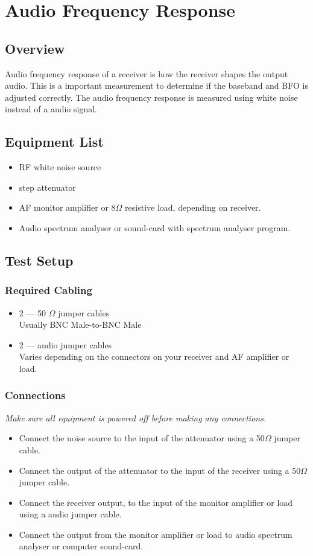 \documentclass[10pt,letterpaper]{book}
\begin{document}
\newpage
\section{Audio Frequency Response}
\subsection*{Overview}
Audio frequency response of a receiver is how the receiver shapes the output audio. This is a important measurement to determine if the baseband and BFO is adjusted correctly. The audio frequency response is measured using white noise instead of a audio signal.  
\subsection*{Equipment List}
\begin{itemize}
	\item RF white noise source
	\item step attenuator 
	\item AF monitor amplifier or 8$\Omega$ resistive load, depending on receiver. 
	\item Audio spectrum analyser or sound-card with spectrum analyser program.
\end{itemize}
\subsection*{Test Setup}
\subsubsection*{Required Cabling}
\begin{itemize}
	\item 2 --- 50 $\Omega$ jumper cables \\
		Usually BNC Male-to-BNC Male
	\item  2 --- audio jumper cables \\
		Varies depending on the connectors on your receiver and AF amplifier or load.
\end{itemize}
\subsubsection*{Connections}
\emph{Make sure all equipment is powered off before making any connections.}
\begin{itemize}
	\item Connect the noise source to the input of the attenuator using a 50$\Omega$ jumper cable.
	\item Connect the output of the attenuator to the input of the receiver using a 50$\Omega$ jumper cable.
	\item Connect the receiver output, to the input of the monitor amplifier or load using a audio jumper cable.
	\item Connect the output from the monitor amplifier or load to audio spectrum analyser or computer sound-card.
\end{itemize}
\end{document}
